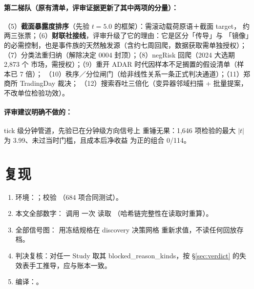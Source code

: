 \documentclass[11pt]{ctexart}
\begin{document}
\paragraph{第二梯队（原有清单，评审证据更新了其中两项的分量）：}
（5）\textbf{截面暴露度排序}（先验 $t=5.0$ 的框架）：需滚动载荷原语＋截面 target，
约两三张票；（6）\textbf{财联社接线}，评审升级了它的理由：它是区分「传导」与
「镜像」的必需控制，也是事件族的天然触发源（含约七周回爬，数据获取需单独授权）；
（7）分类法重归纳（解除决定 0004 封顶）；（8）negRisk 回爬（2024 大选期 2{,}873 个
市场，需授权）；（9）重开 ADAR 时代因样本不足搁置的假设清单（样本已 7 倍）；
（10）秩序／分位闸门（给非线性关系一条正式判决通道）；（11）郑商所 TradingDay 裁决；
（12）搜索吞吐三倍化（变异器邻域扫描 + 批量提案，不改单位检验功效）。

\paragraph{评审建议明确不做的：}tick 级分钟管道，先验已在分钟级方向信号上
重锤无果：1{,}646 项检验的最大 $|t|$ 为 3.99、未过当时门槛，且成本后净收益
为正的组合 0/114。

\section{复现}\label{sec:repro}
\begin{enumerate}\small
\item 环境：；校验
（684 项合同测试）。
\item 本文全部数字： 调用  一次
读取 （哈希链完整性在读取时重算）。
\item 全部信号图： 用冻结规格在 discovery 决策网格
重新求值，不读任何回放存档。
\item 判决复核：对任一 Study 取其 blocked\_reason\_kinds，按 \S\ref{sec:verdict}
的失效表手工推导，应与账本一致。
\item 编译：。
\end{enumerate}

\appendix
\end{document}
